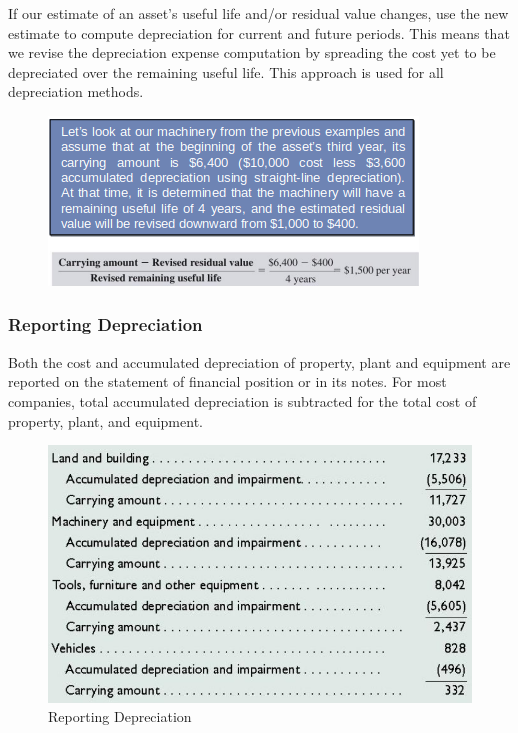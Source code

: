 \documentclass[../main.tex]{subfiles}
\begin{document}
	If our estimate of an asset’s useful life and/or residual value changes, 
	use the new estimate to compute depreciation for current and future 
	periods. This means that we revise the depreciation expense computation by 
	spreading the cost yet to be depreciated over the remaining useful life. 
	This approach is used for all depreciation methods.

	\begin{figure}[ht]
		\centering
		\includegraphics[width=\columnwidth]{images/c8/change_depreciation_estimate_revision_eg.png}
	\end{figure}
	
	\subsubsection{Reporting Depreciation}
	
	Both the cost and accumulated depreciation of  property, plant and 
	equipment are reported on the statement of financial position or in its 
	notes. For most companies, total accumulated depreciation is subtracted for 
	the total cost of property, plant, and equipment.
	
	\begin{figure}[ht]
		\centering
		\includegraphics[width=\columnwidth]{images/c8/reporting_depreciation.png}
		\caption{Reporting Depreciation}
	\end{figure}
\end{document}
